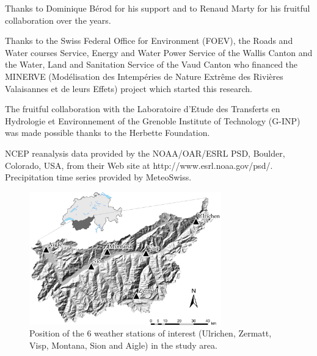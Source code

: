 \documentclass[hess, manuscript]{copernicus}
\begin{document}
\begin{acknowledgements}
Thanks to Dominique B\'{e}rod for his support and to Renaud Marty for his fruitful collaboration over the years. 

Thanks to the Swiss Federal Office for Environment (FOEV), the Roads and Water courses Service, Energy and Water Power Service of the Wallis Canton and the Water, Land and Sanitation Service of the Vaud Canton who financed the MINERVE (Mod\'{e}lisation des Intemp\'{e}ries de Nature Extr\^{e}me des Rivi\`{e}res Valaisannes et de leurs Effets) project which started this research. 

The fruitful collaboration with the Laboratoire d'Etude des Transferts en Hydrologie et Environnement of the Grenoble Institute of Technology (G-INP) was made possible thanks to the Herbette Foundation. 

NCEP reanalysis data provided by the NOAA/OAR/ESRL PSD, Boulder, Colorado, USA, from their Web site at http://www.esrl.noaa.gov/psd/. Precipitation time series provided by MeteoSwiss. 
\end{acknowledgements}










\begin{figure}[htb]
	\begin{center}
		\includegraphics[width=8.3cm]{figures/figure_map.pdf}
	\end{center}
	\caption{Position of the 6 weather stations of interest (Ulrichen, Zermatt, Visp, Montana, Sion and Aigle) in the study area.}
	\label{fig:map}
\end{figure}
\end{document}
